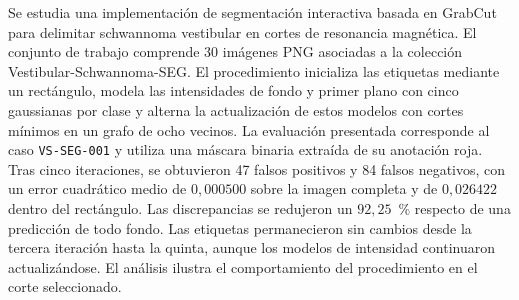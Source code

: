 Se estudia una implementación de segmentación interactiva basada en
GrabCut para delimitar schwannoma vestibular en cortes de resonancia
magnética. El conjunto de trabajo comprende 30 imágenes PNG asociadas a
la colección Vestibular-Schwannoma-SEG. El procedimiento inicializa las
etiquetas mediante un rectángulo, modela las intensidades de fondo y primer
plano con cinco gaussianas por clase y alterna la actualización de estos
modelos con cortes mínimos en un grafo de ocho vecinos. La evaluación
presentada corresponde al caso \texttt{VS-SEG-001} y utiliza una máscara
binaria extraída de su anotación roja. Tras cinco iteraciones, se
obtuvieron 47 falsos positivos y 84 falsos negativos, con un error
cuadrático medio de $0{,}000500$ sobre la imagen completa y de
$0{,}026422$ dentro del rectángulo. Las discrepancias se redujeron un
$92{,}25$~\% respecto de una predicción de todo fondo. Las etiquetas
permanecieron sin cambios desde la tercera iteración hasta la quinta,
aunque los modelos de intensidad continuaron actualizándose. El
análisis ilustra el comportamiento del procedimiento en el corte seleccionado.
